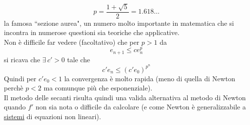 \[ p=\frac{1+\sqrt{5}}{2}=1.618\dotso\]
la famosa ``sezione aurea", un numero molto importante in matematica che si incontra in numerose questioni sia teoriche che applicative.\\
Non è difficile far vedere (facoltativo) che per $p>1$ da 
\[ e_{n+1}\leq ce_n^{p} \]
si ricava che $\exists\, c'>0$ tale che
\[ c'e_n\leq(c'e_0)^{p^n} \]
Quindi per $c'e_0<1$ la convergenza è molto rapida (meno di quella di Newton perchè $p<2$ ma comunque più che esponenziale).\\
Il metodo delle secanti risulta quindi una valida alternativa al metodo di Newton quando $f'$ non sia nota o difficile da calcolare (e come Newton è generalizzabile a \uline{sistemi} di equazioni non lineari).
\newpage


